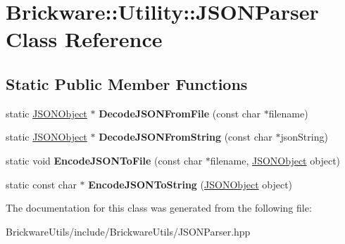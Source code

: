 \hypertarget{classBrickware_1_1Utility_1_1JSONParser}{}\section{Brickware\+:\+:Utility\+:\+:J\+S\+O\+N\+Parser Class Reference}
\label{classBrickware_1_1Utility_1_1JSONParser}
\subsection*{Static Public Member Functions}
\begin{DoxyCompactItemize}
\item 
\hypertarget{classBrickware_1_1Utility_1_1JSONParser_a29fe2b80e817b045831a064d33983f25}{}static \hyperlink{classBrickware_1_1Utility_1_1JSONObject}{J\+S\+O\+N\+Object} $\ast$ {\bfseries Decode\+J\+S\+O\+N\+From\+File} (const char $\ast$filename)\label{classBrickware_1_1Utility_1_1JSONParser_a29fe2b80e817b045831a064d33983f25}

\item 
\hypertarget{classBrickware_1_1Utility_1_1JSONParser_a0152dcf0248518ef951b9b90274f2ea4}{}static \hyperlink{classBrickware_1_1Utility_1_1JSONObject}{J\+S\+O\+N\+Object} $\ast$ {\bfseries Decode\+J\+S\+O\+N\+From\+String} (const char $\ast$json\+String)\label{classBrickware_1_1Utility_1_1JSONParser_a0152dcf0248518ef951b9b90274f2ea4}

\item 
\hypertarget{classBrickware_1_1Utility_1_1JSONParser_a419fd5fd980e6a1040c51714423e8273}{}static void {\bfseries Encode\+J\+S\+O\+N\+To\+File} (const char $\ast$filename, \hyperlink{classBrickware_1_1Utility_1_1JSONObject}{J\+S\+O\+N\+Object} object)\label{classBrickware_1_1Utility_1_1JSONParser_a419fd5fd980e6a1040c51714423e8273}

\item 
\hypertarget{classBrickware_1_1Utility_1_1JSONParser_a46ec79c562eb0fc4bb635f55077d7557}{}static const char $\ast$ {\bfseries Encode\+J\+S\+O\+N\+To\+String} (\hyperlink{classBrickware_1_1Utility_1_1JSONObject}{J\+S\+O\+N\+Object} object)\label{classBrickware_1_1Utility_1_1JSONParser_a46ec79c562eb0fc4bb635f55077d7557}

\end{DoxyCompactItemize}


The documentation for this class was generated from the following file\+:\begin{DoxyCompactItemize}
\item 
Brickware\+Utils/include/\+Brickware\+Utils/J\+S\+O\+N\+Parser.\+hpp\end{DoxyCompactItemize}
